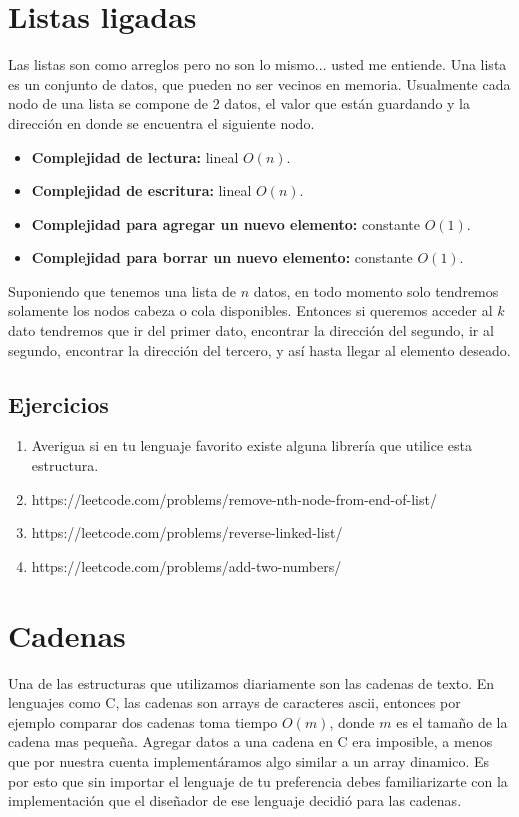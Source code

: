 \section{Listas ligadas}

Las listas son como arreglos pero no son lo mismo... usted me entiende. Una lista es un conjunto de datos, que pueden no ser vecinos en memoria. Usualmente cada nodo de una lista se compone de 2 datos, el valor que están guardando y la dirección en donde se encuentra el siguiente nodo.


\begin{itemize}
    \item \textbf{Complejidad de lectura:} lineal $O(n)$.
    \item \textbf{Complejidad de escritura:} lineal $O(n)$.
    \item \textbf{Complejidad para agregar un nuevo elemento:} constante $O(1)$.
    \item \textbf{Complejidad para borrar un nuevo elemento:} constante $O(1)$.
\end{itemize}


Suponiendo que tenemos una lista de $n$ datos, en todo momento solo tendremos solamente los nodos cabeza o cola disponibles. Entonces si queremos acceder al $k$ dato tendremos que ir del primer dato, encontrar la dirección del segundo, ir al segundo, encontrar la dirección del tercero, y así hasta llegar al elemento deseado.

\subsection{Ejercicios}

\begin{enumerate}    
    \item Averigua si en tu lenguaje favorito existe alguna librería que utilice esta estructura.
    \item https://leetcode.com/problems/remove-nth-node-from-end-of-list/
    \item https://leetcode.com/problems/reverse-linked-list/
    \item https://leetcode.com/problems/add-two-numbers/
\end{enumerate}

\section{Cadenas}

Una de las estructuras que utilizamos diariamente son las cadenas de texto. En lenguajes como C, las cadenas son arrays de caracteres ascii, entonces por ejemplo comparar dos cadenas toma tiempo $O(m)$, donde $m$ es el tamaño de la cadena mas pequeña. Agregar datos a una cadena en C era imposible, a menos que por nuestra cuenta implementáramos algo similar a un array dinamico. Es por esto que sin importar el lenguaje de tu preferencia debes familiarizarte con la implementación que el diseñador de ese lenguaje decidió para las cadenas.

